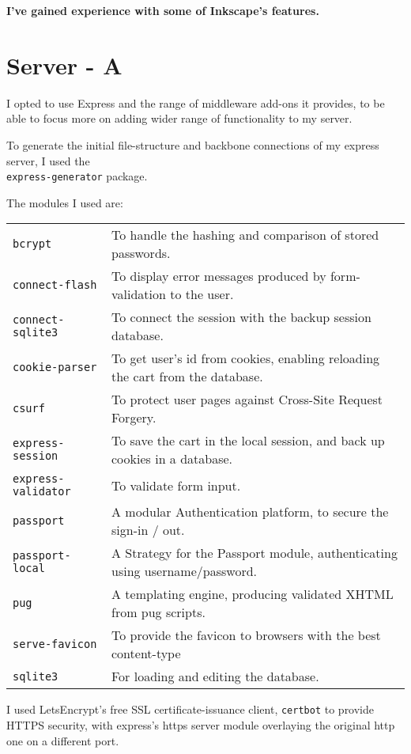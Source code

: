 \documentclass[12pt]{article}
\begin{document}
\textbf{ I've gained experience with some of Inkscape's features.}


\section*{Server \large\normalfont - A}
I opted to use Express and the range of middleware add-ons it provides, to be able to focus more on adding wider range of  functionality to my server. 

To generate the initial file-structure and backbone connections of my express server, I used
the \\\verb|express-generator| package.

The modules I used are: 
\vspace{-2.5em}
\begin{center}
\begin{tabular}{ll}
\verb|bcrypt| & To handle the hashing and comparison of stored passwords.\\ 
\verb|connect-flash| & To display error messages produced by form-validation to the user.\\ 
\verb|connect-sqlite3| & To connect the session with the backup session database.\\ 
\verb|cookie-parser| & To get user's id from cookies, enabling reloading the cart from the database.\\ 
\verb|csurf| & To protect user pages against Cross-Site Request Forgery. \\ 
\verb|express-session| & To save the cart in the local session, and back up cookies in a database.\\ 
\verb|express-validator| & To validate form input.\\ 
\verb|passport| & A modular Authentication platform, to secure the sign-in / out. \\
\verb|passport-local| & A Strategy for the Passport module, authenticating using username/password.\\ 
\verb|pug| & A templating engine, producing validated XHTML from pug scripts.\\ 
\verb|serve-favicon| & To provide the favicon to browsers with the best content-type \\ 
\verb|sqlite3| & For loading and editing the database.
\end{tabular}
\end{center}


I used LetsEncrypt's free SSL certificate-issuance client, \verb|certbot| to provide HTTPS security, with express's https server module overlaying the original http one on a different port.
\end{document}
